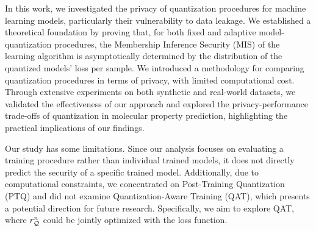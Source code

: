 In this work, we investigated the privacy of quantization procedures for machine learning models, particularly their vulnerability to data leakage. We established a theoretical foundation by proving that, for both fixed and adaptive model-quantization procedures, the Membership Inference Security (MIS) of the learning algorithm is asymptotically determined by the distribution of the quantized models’ loss per sample.
We introduced a methodology for comparing quantization procedures in terms of privacy, with limited computational cost. Through extensive experiments on both synthetic and real-world datasets, we validated the effectiveness of our approach and explored the privacy-performance trade-offs of quantization in molecular property prediction, highlighting the practical implications of our findings.

Our study has some limitations.  Since our analysis focuses on evaluating a training procedure rather than individual trained models, it does not directly predict the security of a specific trained model. Additionally, due to computational constraints, we concentrated on Post-Training Quantization (PTQ) and did not examine Quantization-Aware Training (QAT), which presents a potential direction for future research. 
 Specifically, we aim to explore QAT, where $r_{\mathcal{Q}}^n$ could be jointly optimized with the loss function.